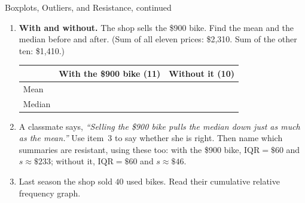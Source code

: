 \documentclass[12pt]{article}
\begin{document}
\boxguard[30]
\begin{notesbox}{Boxplots, Outliers, and Resistance, continued}
\begin{enumerate}[leftmargin=1.6em, itemsep=5pt, topsep=2pt, start=3]

  \item \textbf{With and without.} The shop sells the \$900 bike. Find the mean and the median
        before and after. (Sum of all eleven prices: \$2{,}310. Sum of the other ten:
        \$1{,}410.)

        \begin{center}
        \renewcommand{\arraystretch}{1.3}
        \begin{tabularx}{\linewidth}{@{} l Y Y @{}}
        \toprule
        & \textbf{With the \$900 bike (11)} & \textbf{Without it (10)} \\
        \midrule
        Mean   &  &  \\
        Median &  &  \\
        \bottomrule
        \end{tabularx}
        \end{center}

  \item A classmate says, \emph{``Selling the \$900 bike pulls the median down just as much as
        the mean.''} Use item~3 to say whether she is right. Then name which summaries are
        resistant, using these too: with the \$900 bike, $\text{IQR} = \$60$ and
        $s \approx \$233$; without it, $\text{IQR} = \$60$ and $s \approx \$46$.
        \gradedresponse{\gradedblank[id=q4, type=rubric, points=2, display={No --- the mean fell \$69 (\$210 to \$141); the median only \$5. Resistant: the median and IQR. Not resistant: the mean and SD.}]{\linewidth}{2in}}

  \item Last season the shop sold $40$ used bikes. Read their cumulative relative frequency
        graph.


\end{enumerate}
\end{notesbox}
\end{document}
